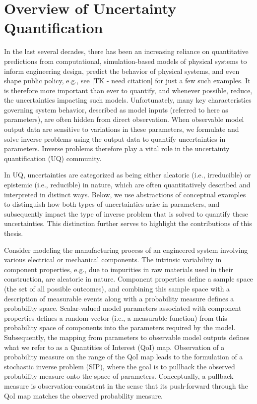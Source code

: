 \section{Overview of Uncertainty Quantification}\label{sec:intro}

In the last several decades, there has been an increasing reliance on quantitative predictions from computational, simulation-based models of physical systems to inform engineering design, predict the behavior of physical systems, and even shape public policy, e.g., see [TK - need citation] for just a few such examples.
It is therefore more important than ever to quantify, and whenever possible, reduce, the uncertainties impacting such models.
Unfortunately, many key characteristics governing system behavior, described as model inputs (referred to here as parameters), are often hidden from direct observation.
When observable model output data are sensitive to variations in these parameters, we formulate and solve inverse problems using the output data to quantify uncertainties in parameters.
Inverse problems therefore play a vital role in the uncertainty quantification (UQ) community.

In UQ, uncertainties are categorized as being either aleatoric (i.e., irreducible) or epistemic (i.e., reducible) in nature, which are often quantitatively described and interpreted in distinct ways.
Below, we use abstractions of conceptual examples to distinguish how both types of uncertainties arise in parameters, and subsequently impact the type of inverse problem that is solved to quantify these uncertainties.
This distinction further serves to highlight the contributions of this thesis.

Consider modeling the manufacturing process of an engineered system involving various electrical or mechanical components.
The intrinsic variability in component properties, e.g., due to impurities in raw materials used in their construction, are aleatoric in nature.
Component properties define a sample space (the set of all possible outcomes), and combining this sample space with a description of measurable events along with a probability measure defines a probability space.
Scalar-valued model parameters associated with component properties defines a random vector (i.e., a measurable function) from this probability space of components into the parameters required by the model.
Subsequently, the mapping from parameters to observable model outputs defines what we refer to as a Quantities of Interest (QoI) map.
Observation of a probability measure on the range of the QoI map leads to the formulation of a stochastic inverse problem (SIP), where the goal is to pullback the observed probability measure onto the space of parameters.
Conceptually, a pullback measure is observation-consistent in the sense that its push-forward through the QoI map matches the observed probability measure.

